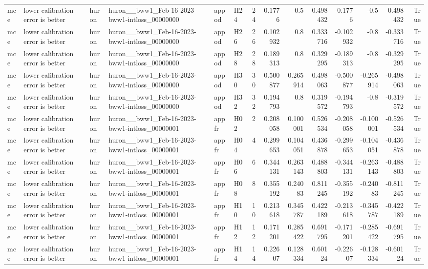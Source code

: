\begin{longtable}{llllllrrrrrrrr}
mce & lower calibration error is better & huron & huron\_\_bww1\_Feb-16-2023-bww1-intloss\_00000000 & appod & H24 & 24 & 0.1776 & 0.5 & 0.498432 & -0.1776 & -0.5 & -0.498432 & True \\
mce & lower calibration error is better & huron & huron\_\_bww1\_Feb-16-2023-bww1-intloss\_00000000 & appod & H26 & 26 & 0.102932 & 0.8 & 0.333716 & -0.102932 & -0.8 & -0.333716 & True \\
mce & lower calibration error is better & huron & huron\_\_bww1\_Feb-16-2023-bww1-intloss\_00000000 & appod & H28 & 28 & 0.189313 & 0.8 & 0.329295 & -0.189313 & -0.8 & -0.329295 & True \\
mce & lower calibration error is better & huron & huron\_\_bww1\_Feb-16-2023-bww1-intloss\_00000000 & appod & H30 & 30 & 0.500877 & 0.265914 & 0.498063 & -0.500877 & -0.265914 & -0.498063 & True \\
mce & lower calibration error is better & huron & huron\_\_bww1\_Feb-16-2023-bww1-intloss\_00000000 & appod & H32 & 32 & 0.194793 & 0.8 & 0.319572 & -0.194793 & -0.8 & -0.319572 & True \\
mce & lower calibration error is better & huron & huron\_\_bww1\_Feb-16-2023-bww1-intloss\_00000001 & appfr & H02 & 2 & 0.208058 & 0.100001 & 0.526534 & -0.208058 & -0.100001 & -0.526534 & True \\
mce & lower calibration error is better & huron & huron\_\_bww1\_Feb-16-2023-bww1-intloss\_00000001 & appfr & H04 & 4 & 0.299653 & 0.104051 & 0.436878 & -0.299653 & -0.104051 & -0.436878 & True \\
mce & lower calibration error is better & huron & huron\_\_bww1\_Feb-16-2023-bww1-intloss\_00000001 & appfr & H06 & 6 & 0.344131 & 0.263143 & 0.488803 & -0.344131 & -0.263143 & -0.488803 & True \\
mce & lower calibration error is better & huron & huron\_\_bww1\_Feb-16-2023-bww1-intloss\_00000001 & appfr & H08 & 8 & 0.355192 & 0.24083 & 0.811245 & -0.355192 & -0.24083 & -0.811245 & True \\
mce & lower calibration error is better & huron & huron\_\_bww1\_Feb-16-2023-bww1-intloss\_00000001 & appfr & H10 & 10 & 0.213618 & 0.345787 & 0.422189 & -0.213618 & -0.345787 & -0.422189 & True \\
mce & lower calibration error is better & huron & huron\_\_bww1\_Feb-16-2023-bww1-intloss\_00000001 & appfr & H12 & 12 & 0.171201 & 0.285422 & 0.691795 & -0.171201 & -0.285422 & -0.691795 & True \\
mce & lower calibration error is better & huron & huron\_\_bww1\_Feb-16-2023-bww1-intloss\_00000001 & appfr & H14 & 14 & 0.22607 & 0.128334 & 0.60124 & -0.22607 & -0.128334 & -0.60124 & True \\

\end{longtable}
